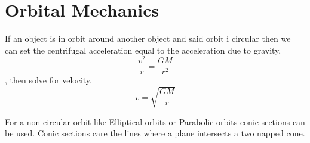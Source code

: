 \documentclass{article}
\begin{document}
\section{Orbital Mechanics}

If an object is in orbit around another object and said orbit i circular then we can set the centrifugal acceleration equal to the acceleration due to gravity, $$\frac{v^2}{r}=\frac{GM}{r^2}$$, then solve for velocity.
\begin{equation}
v=\sqrt{\frac{GM}{r}}
\end{equation}

For a non-circular orbit like Elliptical orbits or Parabolic orbits conic sections can be used. Conic sections care the lines where a plane intersects a two napped cone.
\end{document}
